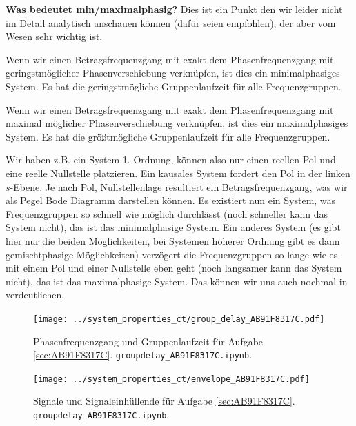\begin{mdframed}
\textbf{Was bedeutet min/maximalphasig?}
Dies ist ein Punkt den wir leider nicht im Detail analytisch anschauen können
(dafür seien \cite{LangeSigSys1, Fliege1991} empfohlen), der aber vom Wesen sehr
wichtig ist.

Wenn wir einen Betragsfrequenzgang mit exakt dem Phasenfrequenzgang
mit geringstmöglicher Phasenverschiebung verknüpfen, ist dies ein minimalphasiges
System. Es hat die geringstmögliche Gruppenlaufzeit für alle Frequenzgruppen.

Wenn wir einen Betragsfrequenzgang mit exakt dem Phasenfrequenzgang
mit maximal möglicher Phasenverschiebung verknüpfen, ist dies ein maximalphasiges
System. Es hat die größtmögliche Gruppenlaufzeit für alle Frequenzgruppen.

Wir haben z.B. ein System 1. Ordnung, können also nur einen reellen Pol und
eine reelle Nullstelle platzieren. Ein kausales System fordert den Pol in der linken
$s$-Ebene. Je nach Pol, Nullstellenlage resultiert ein Betragsfrequenzgang,
was wir als Pegel Bode Diagramm darstellen können.
Es existiert nun ein System, was Frequenzgruppen so schnell wie möglich durchlässt
(noch schneller kann das System nicht), das ist das minimalphasige System.
Ein anderes System (es gibt hier nur die beiden Möglichkeiten, bei Systemen
höherer Ordnung gibt es dann gemischtphasige Möglichkeiten)
verzögert die Frequenzgruppen so lange wie es mit einem Pol und einer
Nullstelle eben geht (noch langsamer kann das System nicht), das ist das maximalphasige
System.
Das können wir uns auch nochmal in 
verdeutlichen.

\end{mdframed}


\begin{figure}[h]
\centering
\texttt{[image: ../system\_properties\_ct/group\_delay\_AB91F8317C.pdf]}
\caption{Phasenfrequenzgang und Gruppenlaufzeit für Aufgabe \ref{sec:AB91F8317C}.
\texttt{groupdelay\_AB91F8317C.ipynb}.}
\label{fig:group_delay_AB91F8317C}
\end{figure}
%
%
%
\begin{figure}[h]
\centering
\texttt{[image: ../system\_properties\_ct/envelope\_AB91F8317C.pdf]}
\caption{Signale und Signaleinhüllende für Aufgabe \ref{sec:AB91F8317C}.
\texttt{groupdelay\_AB91F8317C.ipynb}.}
\label{fig:envelope_AB91F8317C}
\end{figure}
